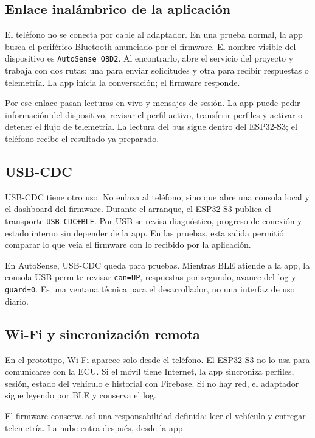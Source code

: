 \documentclass[12pt,letterpaper]{report}
\begin{document}
\subsection{Enlace inalámbrico de la aplicación}

El teléfono no se conecta por cable al adaptador. En una prueba normal, la app busca el periférico Bluetooth anunciado por el firmware. El nombre visible del dispositivo es \texttt{AutoSense OBD2}. Al encontrarlo, abre el servicio del proyecto y trabaja con dos rutas: una para enviar solicitudes y otra para recibir respuestas o telemetría. La app inicia la conversación; el firmware responde.

Por ese enlace pasan lecturas en vivo y mensajes de sesión. La app puede pedir información del dispositivo, revisar el perfil activo, transferir perfiles y activar o detener el flujo de telemetría. La lectura del bus sigue dentro del ESP32-S3; el teléfono recibe el resultado ya preparado.

\subsection{USB-CDC}

USB-CDC tiene otro uso. No enlaza al teléfono, sino que abre una consola local y el dashboard del firmware. Durante el arranque, el ESP32-S3 publica el transporte \texttt{USB-CDC+BLE}. Por USB se revisa diagnóstico, progreso de conexión y estado interno sin depender de la app. En las pruebas, esta salida permitió comparar lo que veía el firmware con lo recibido por la aplicación.

En AutoSense, USB-CDC queda para pruebas. Mientras BLE atiende a la app, la consola USB permite revisar \texttt{can=UP}, respuestas por segundo, avance del log y \texttt{guard=0}. Es una ventana técnica para el desarrollador, no una interfaz de uso diario.

\subsection{Wi-Fi y sincronización remota}

En el prototipo, Wi-Fi aparece solo desde el teléfono. El ESP32-S3 no lo usa para comunicarse con la ECU. Si el móvil tiene Internet, la app sincroniza perfiles, sesión, estado del vehículo e historial con Firebase. Si no hay red, el adaptador sigue leyendo por BLE y conserva el log.

El firmware conserva así una responsabilidad definida: leer el vehículo y entregar telemetría. La nube entra después, desde la app.
\end{document}
